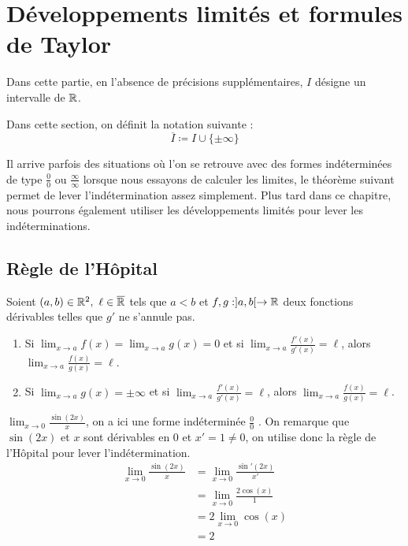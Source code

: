 \chapter{Développements limités et formules de Taylor}

Dans cette partie, en l'absence de précisions supplémentaires, $I$ désigne un intervalle de $\mathbb{R}$.

\begin{notation}
    Dans cette section, on définit la notation suivante : 
    \[ \overline{I} \coloneqq I \cup \{\pm \infty\} \]
\end{notation}

\par Il arrive parfois des situations où l'on se retrouve avec des formes indéterminées de type \og $\frac{0}{0}$ \fg ou \og $\frac{\infty}{\infty}$ \fg lorsque nous essayons de calculer les limites, le théorème suivant permet de lever l'indétermination assez simplement.
Plus tard dans ce chapitre, nous pourrons également utiliser les développements limités pour lever les indéterminations.
\section{Règle de l'Hôpital}
\begin{theorem}
    Soient $(a, b) \in \mathbb{R}^2,\ \ell \in \overline{\mathbb{R}}$ tels que $a < b$ et $f, g : ]a, b[ \to \mathbb{R}$ deux fonctions dérivables telles que $g'$ ne s'annule pas. 
    \begin{enumerate}
        \item Si $\lim_{x \to a} f(x) = \lim_{x \to a} g(x) = 0$ et si $\lim_{x \to a} \frac{f'(x)}{g'(x)} = \ell$, alors $\lim_{x \to a} \frac{f(x)}{g(x)} = \ell$.
        \item Si $\lim_{x \to a} g(x) = \pm \infty$ et si $\lim_{x \to a} \frac{f'(x)}{g'(x)} = \ell$, alors $\lim_{x \to a} \frac{f(x)}{g(x)} = \ell$.
    \end{enumerate}
\end{theorem}


\begin{example}
    $\lim_{x \to 0} \frac{\sin(2x)}{x}$, on a ici une forme indéterminée \og $\frac{0}{0}$ \fg.
    On remarque que $\sin(2x)$ et $x$ sont dérivables en 0 et $x' = 1 \neq 0$, on utilise donc la règle de l'Hôpital pour lever l'indétermination.
    \begin{align*}
        \lim_{x \to 0} \frac{\sin(2x)}{x} &= \lim_{x \to 0} \frac{\sin'(2x)}{x'} \\
        &= \lim_{x \to 0} \frac{2 \cos(x)}{1} \\
        &= 2 \lim_{x \to 0} \cos(x) \\
        &= 2
    \end{align*}
\end{example}

